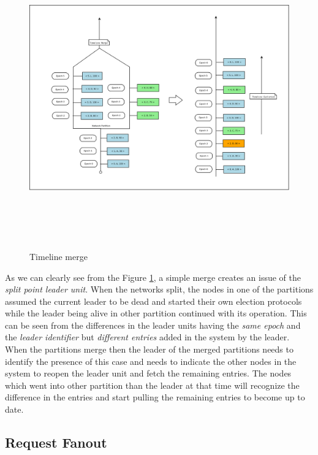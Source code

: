 \documentclass[a4paper,11pt]{kth-mag}
\begin{document}
\begin{figure}
	\includegraphics[width=14cm, height= 13cm]{timeline-merge}

	\caption{Timeline merge}
	\label{fig:timelineMerge}
\end{figure}


\newpage As we can clearly see from the Figure \ref{fig:timelineMerge}, a simple merge creates an issue of the \textit{split point leader unit}. When the networks split, the nodes in one of the partitions assumed the current leader to be dead and started their own election protocols while the leader being alive in other partition continued with its operation. This can be seen from the differences in the leader units having the \textit{same epoch} and the \textit{leader identifier}  but \textit{different entries} added in the system by the leader. When the partitions merge then the leader of the merged partitions needs to identify the presence of this case and needs to indicate the other nodes in the system to reopen the leader unit and fetch the remaining entries. The nodes which went into other partition than the leader at that time will recognize the difference in the entries and start pulling the remaining entries to become up to date.


\subsection{Request Fanout}
\end{document}
